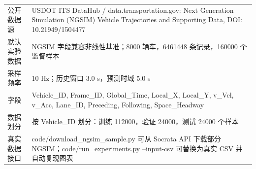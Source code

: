 \begin{tabularx}{\textwidth}{lX}
\toprule
公开数据源 & USDOT ITS DataHub / data.transportation.gov: Next Generation Simulation (NGSIM) Vehicle Trajectories and Supporting Data, DOI: 10.21949/1504477 \\ 
默认实验数据 & NGSIM 字段兼容非线性基准；8000 辆车，6461448 条记录，160000 个监督样本 \\ 
采样频率 & 10 Hz；历史窗口 3.0 s，预测时域 5.0 s \\ 
字段 & Vehicle\_ID, Frame\_ID, Global\_Time, Local\_X, Local\_Y, v\_Vel, v\_Acc, Lane\_ID, Preceding, Following, Space\_Headway \\ 
数据划分 & 按 Vehicle\_ID 划分：训练 112000，验证 24000，测试 24000 个样本 \\ 
真实数据接口 & code/download\_ngsim\_sample.py 可从 Socrata API 下载部分 NGSIM；code/run\_experiments.py --input-csv 可替换为真实 CSV 并自动复现图表 \\ 
\bottomrule
\end{tabularx}
